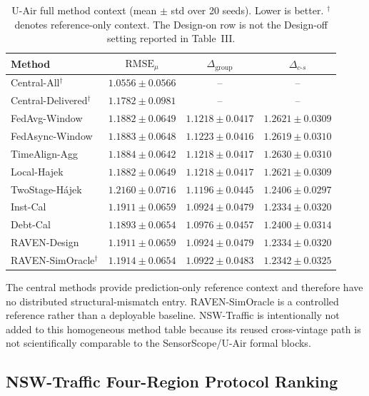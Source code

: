\begin{table}[t]
\centering
\caption{U-Air full method context (mean $\pm$ std over 20 seeds).
Lower is better.  $^\dagger$ denotes reference-only context.
The Design-on row is not the Design-off setting reported in Table~III.}
\label{tab:app_e3_uair}
\scriptsize
\setlength{\tabcolsep}{3pt}
\begin{tabular*}{\textwidth}{@{\extracolsep{\fill}}lccc}
\toprule
Method & $\mathrm{RMSE}_{\mu}$ & $\Delta_{\mathrm{group}}$ & $\Delta_{c\text{-}s}$\\
\midrule
Central-All$^{\dagger}$ & $1.0556\pm0.0566$ & -- & -- \\
Central-Delivered$^{\dagger}$ & $1.1782\pm0.0981$ & -- & -- \\
FedAvg-Window & $1.1882\pm0.0649$ & $1.1218\pm0.0417$ & $1.2621\pm0.0309$ \\
FedAsync-Window & $1.1883\pm0.0648$ & $1.1223\pm0.0416$ & $1.2619\pm0.0310$ \\
TimeAlign-Agg & $1.1884\pm0.0642$ & $1.1218\pm0.0417$ & $1.2630\pm0.0310$ \\
Local-Hajek & $1.1882\pm0.0649$ & $1.1218\pm0.0417$ & $1.2621\pm0.0309$ \\
TwoStage-H\'ajek & $1.2160\pm0.0716$ & $1.1196\pm0.0445$ & $1.2406\pm0.0297$ \\
Inst-Cal & $1.1911\pm0.0659$ & $1.0924\pm0.0479$ & $1.2334\pm0.0320$ \\
Debt-Cal & $1.1893\pm0.0654$ & $1.0976\pm0.0457$ & $1.2400\pm0.0314$ \\
RAVEN-Design & $1.1911\pm0.0659$ & $1.0924\pm0.0479$ & $1.2334\pm0.0320$ \\
RAVEN-SimOracle$^{\dagger}$ & $1.1914\pm0.0654$ & $1.0922\pm0.0483$ & $1.2342\pm0.0325$ \\
\bottomrule
\end{tabular*}
\end{table}

The central methods provide prediction-only reference context and therefore
have no distributed structural-mismatch entry.  RAVEN-SimOracle is a controlled
reference rather than a deployable baseline.  NSW-Traffic is intentionally not
added to this homogeneous method table because its reused cross-vintage path is not
scientifically comparable to the SensorScope/U-Air formal blocks.

\subsection{NSW-Traffic Four-Region Protocol Ranking}
\label{app:traffic_four_region}

